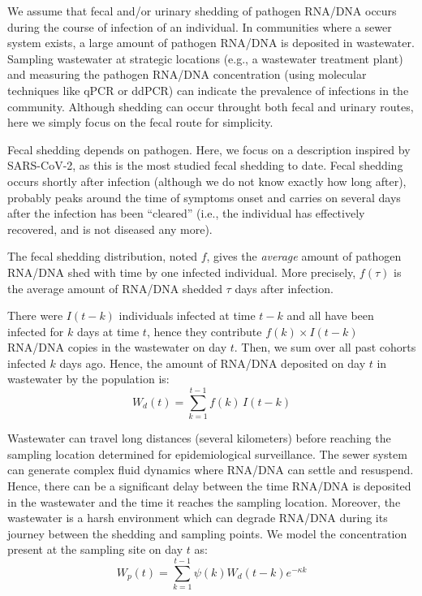 \documentclass[11pt]{article} %
\begin{document}
We assume that fecal and/or urinary shedding of pathogen RNA/DNA occurs during the course of infection of an individual. In communities where a sewer system exists, a large amount of pathogen RNA/DNA is deposited in wastewater. Sampling wastewater at strategic locations (e.g., a wastewater treatment plant) and measuring the pathogen RNA/DNA concentration (using molecular techniques like qPCR or ddPCR) can indicate the prevalence of infections in the community. 
Although shedding can occur throught both fecal and urinary routes, here we simply focus on the fecal route for simplicity. 

Fecal shedding depends on pathogen. Here, we focus on a description inspired by SARS-CoV-2, as this is the most studied fecal shedding to date. 
Fecal shedding occurs shortly after infection (although we do not know exactly how long after), probably peaks around the time of symptoms onset and carries on several days after the infection has been ``cleared'' (i.e., the individual has effectively recovered, and is not diseased any more). 
 
The fecal shedding distribution, noted $f$, gives the \emph{average} amount of pathogen RNA/DNA shed with time by one infected individual. 
More precisely, $f(\tau)$ is the average amount of RNA/DNA shedded $\tau$ days after infection. 

There were $I(t-k)$ individuals infected at time $t-k$ and all have been infected for $k$ days at time $t$, hence they contribute $f(k) \times I(t-k)$ RNA/DNA copies in the wastewater on day $t$. Then, we sum over all past cohorts infected $k$ days ago. 
Hence, the amount of RNA/DNA deposited on day $t$ in wastewater by the population is:
\begin{equation}
W_d(t) = \sum_{k=1}^{t-1} f(k) \, I(t-k)
\end{equation}

Wastewater can travel long distances (several kilometers) before reaching the sampling location determined for epidemiological surveillance. The sewer system can generate complex fluid dynamics where RNA/DNA can settle and resuspend.
Hence, there can be a significant delay between the time RNA/DNA is deposited in the wastewater and the time it reaches the sampling location. 
Moreover, the wastewater is a harsh environment which can degrade RNA/DNA during its journey between the shedding and sampling points. 
We model the concentration present at the sampling site on day $t$ as:
\begin{equation}
W_p(t) = \sum_{k=1}^{t-1} \psi(k) W_d(t-k) e^{-\kappa k}
\end{equation}
\end{document}
